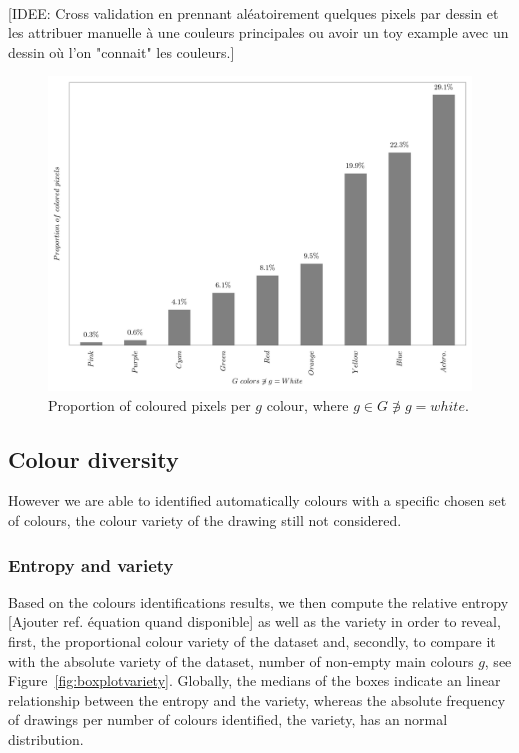 \documentclass[11pt,a4paper]{article}
\begin{document}
\ 

{\color{teal}[IDEE: Cross validation en prennant al\' eatoirement quelques pixels par dessin et les attribuer manuelle \`a une couleurs principales ou avoir un toy example avec un dessin o\`u l'on "connait" les couleurs.]}

\begin{figure}[h!]
	\centering
	\includegraphics[width=\linewidth]{figures/colors-barplot.png}
	\caption{Proportion of coloured pixels per $g$ colour, where $g \in G \not\ni g = white$.}
	\label{fig:propcolours}
\end{figure}


\subsection{Colour diversity}
\label{sec:results_diversity}
However we are able to identified automatically colours with a specific chosen set of colours, the colour variety of the drawing still not considered. 

\subsubsection{Entropy and variety}
Based on the colours identifications results, we then compute the relative entropy {\color{red}[Ajouter ref. \'equation quand disponible]} as well as the variety in order to reveal, first, the proportional colour variety of the dataset and, secondly, to compare it with the absolute variety of the dataset, number of non-empty main colours $g$, see Figure~\ref{fig:boxplotvariety}.
Globally, the medians of the boxes indicate an linear  relationship between the entropy and the variety, whereas the absolute frequency of drawings per number of colours identified, the variety, has an normal distribution.
\end{document}
